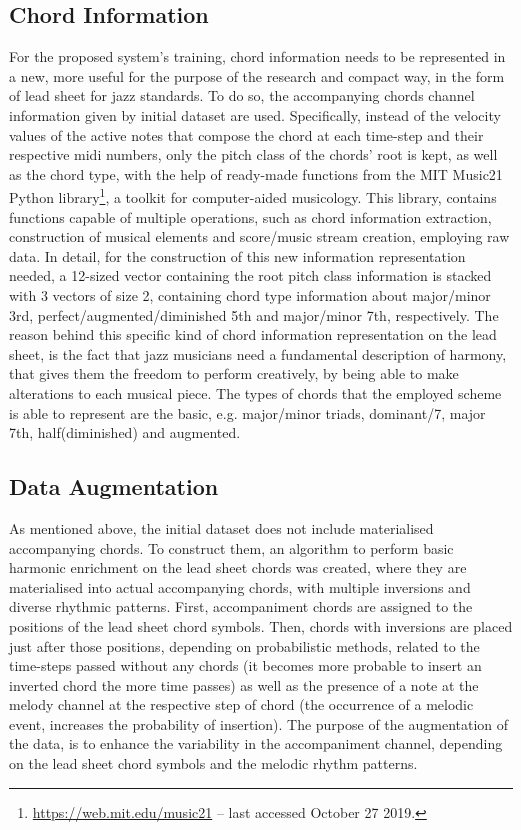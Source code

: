         \subsection{Chord Information} \label{subsec:chord_info}
        For the proposed system's training, chord information needs to be represented in a new, more useful for the purpose of the research and compact way, in the form of lead sheet for jazz standards. To do so, the accompanying chords channel information given by initial dataset are used. Specifically, instead of the velocity values of the active notes that compose the chord at each time-step and their respective midi numbers, only the pitch class of the chords' root is kept, as well as the chord type, with the help of ready-made functions from the MIT Music21 Python library\footnote{\url{https://web.mit.edu/music21} -- last accessed October 27 2019.}, a toolkit for computer-aided musicology. This library, contains functions capable of multiple operations, such as chord information extraction, construction of musical elements and score/music stream creation, employing raw data. In detail, for the construction of this new information representation needed, a 12-sized vector containing the root pitch class information is stacked with 3 vectors of size 2, containing chord type information about major/minor 3rd, perfect/augmented/diminished 5th and major/minor 7th, respectively. The reason behind this specific kind of chord information representation on the lead sheet, is the fact that jazz musicians need a fundamental description of harmony, that gives them the freedom to perform creatively, by being able to make alterations to each musical piece. The types of chords that the employed scheme is able to represent are the basic, e.g. major/minor triads, dominant/7, major 7th, half(diminished) and augmented.
        
        \subsection{Data Augmentation}
        As mentioned above, the initial dataset does not include materialised accompanying chords. To construct them, an algorithm to perform basic harmonic enrichment on the lead sheet chords was created, where they are materialised into actual accompanying chords, with multiple inversions and diverse rhythmic patterns. First, accompaniment chords are assigned to the positions of the lead sheet chord symbols. Then, chords with inversions are placed just after those positions, depending on probabilistic methods, related to the time-steps passed without any chords (it becomes more probable to insert an inverted chord the more time passes) as well as the presence of a note at the melody channel at the respective step of chord (the occurrence of a melodic event, increases the probability of insertion). The purpose of the augmentation of the data, is to enhance the variability in the accompaniment channel, depending on the lead sheet chord symbols and the melodic rhythm patterns.

